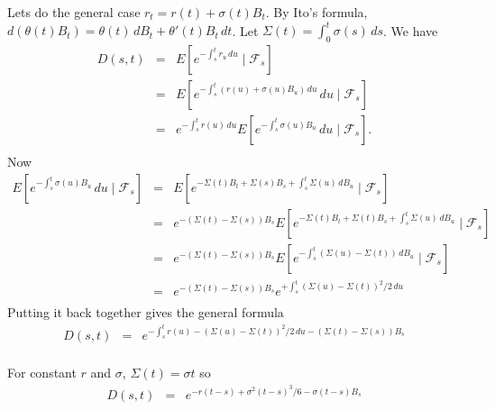 \documentclass[11pt,fleqn]{amsproc}
\newcommand{\F}{\mathcal{F}}
\begin{document}
Lets do the general case $r_t = r(t) + \sigma(t) B_t$.
By Ito's formula, $d(\theta(t)B_t) = \theta(t)\,dB_t + \theta'(t)B_t\,dt$.
Let $\Sigma(t) = \int_0^t \sigma(s)\,ds$. We have
\begin{eqnarray*}
D(s,t) &=&
E[e^{-\int_s^t r_u\,du}\mid\F_s]\\
&=& E[e^{-\int_s^t (r(u) + \sigma(u)B_u)\,du}\,du\mid\F_s]\\
&=& e^{-\int_s^t r(u)\,du}E[e^{-\int_s^t \sigma(u)B_u}\,du\mid\F_s].\\
\end{eqnarray*}
Now
\begin{eqnarray*}
E[e^{-\int_s^t \sigma(u)B_u}\,du\mid\F_s] 
&=& E[e^{-\Sigma(t)B_t + \Sigma(s)B_s
	+\int_s^t \Sigma(u)\,dB_u}\mid\F_s]\\
&=& e^{-(\Sigma(t) - \Sigma(s))B_s}
	E[e^{-\Sigma(t)B_t + \Sigma(t)B_s
	+\int_s^t \Sigma(u)\,dB_u}\mid\F_s]\\
&=& e^{-(\Sigma(t) - \Sigma(s))B_s}
	E[e^{-\int_s^t (\Sigma(u) - \Sigma(t))\,dB_u}\mid\F_s]\\
&=& e^{-(\Sigma(t) - \Sigma(s))B_s}
	e^{+\int_s^t (\Sigma(u) - \Sigma(t))^2/2\,du}\\
\end{eqnarray*}
Putting it back together gives the general formula
\begin{eqnarray*}
D(s,t)
&=& e^{-\int_s^t r(u) - (\Sigma(u) - \Sigma(t))^2/2\,du
-(\Sigma(t) - \Sigma(s))B_s}\\
\end{eqnarray*}

For constant $r$ and $\sigma$, $\Sigma(t) = \sigma t$ so
\begin{eqnarray*}
D(s,t)
&=& e^{-r(t - s) + \sigma^2(t - s)^3/6 - \sigma(t - s)B_s}\\
\end{eqnarray*}
\end{document}
